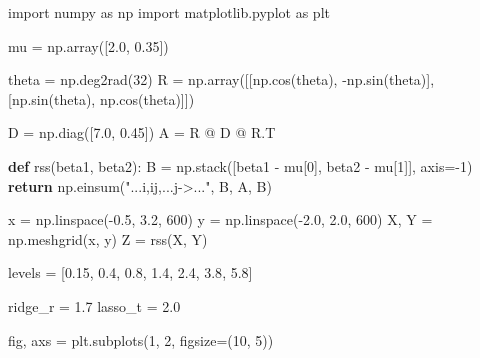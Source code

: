 \documentclass[
  letterpaper,
  DIV=11,
  numbers=noendperiod]{scrreprt}
\newenvironment{Shaded}{\begin{snugshade}}{\end{snugshade}}
\newcommand{\ControlFlowTok}[1]{\textcolor[rgb]{0.00,0.23,0.31}{\textbf{#1}}}
\newcommand{\DecValTok}[1]{\textcolor[rgb]{0.68,0.00,0.00}{#1}}
\newcommand{\FloatTok}[1]{\textcolor[rgb]{0.68,0.00,0.00}{#1}}
\newcommand{\ImportTok}[1]{\textcolor[rgb]{0.00,0.46,0.62}{#1}}
\newcommand{\KeywordTok}[1]{\textcolor[rgb]{0.00,0.23,0.31}{\textbf{#1}}}
\newcommand{\NormalTok}[1]{\textcolor[rgb]{0.00,0.23,0.31}{#1}}
\newcommand{\OperatorTok}[1]{\textcolor[rgb]{0.37,0.37,0.37}{#1}}
\newcommand{\StringTok}[1]{\textcolor[rgb]{0.13,0.47,0.30}{#1}}
\theoremstyle{definition}
\theoremstyle{definition}
\theoremstyle{plain}
\theoremstyle{plain}
\theoremstyle{remark}
\begin{document}
\begin{Shaded}
\begin{Highlighting}[]
\ImportTok{import}\NormalTok{ numpy }\ImportTok{as}\NormalTok{ np}
\ImportTok{import}\NormalTok{ matplotlib.pyplot }\ImportTok{as}\NormalTok{ plt}

\NormalTok{mu }\OperatorTok{=}\NormalTok{ np.array([}\FloatTok{2.0}\NormalTok{, }\FloatTok{0.35}\NormalTok{])}

\NormalTok{theta }\OperatorTok{=}\NormalTok{ np.deg2rad(}\DecValTok{32}\NormalTok{)}
\NormalTok{R }\OperatorTok{=}\NormalTok{ np.array([[np.cos(theta), }\OperatorTok{{-}}\NormalTok{np.sin(theta)], [np.sin(theta), np.cos(theta)]])}

\NormalTok{D }\OperatorTok{=}\NormalTok{ np.diag([}\FloatTok{7.0}\NormalTok{, }\FloatTok{0.45}\NormalTok{])}
\NormalTok{A }\OperatorTok{=}\NormalTok{ R }\OperatorTok{@}\NormalTok{ D }\OperatorTok{@}\NormalTok{ R.T}


\KeywordTok{def}\NormalTok{ rss(beta1, beta2):}
\NormalTok{    B }\OperatorTok{=}\NormalTok{ np.stack([beta1 }\OperatorTok{{-}}\NormalTok{ mu[}\DecValTok{0}\NormalTok{], beta2 }\OperatorTok{{-}}\NormalTok{ mu[}\DecValTok{1}\NormalTok{]], axis}\OperatorTok{={-}}\DecValTok{1}\NormalTok{)}
    \ControlFlowTok{return}\NormalTok{ np.einsum(}\StringTok{"...i,ij,...j{-}\textgreater{}..."}\NormalTok{, B, A, B)}


\NormalTok{x }\OperatorTok{=}\NormalTok{ np.linspace(}\OperatorTok{{-}}\FloatTok{0.5}\NormalTok{, }\FloatTok{3.2}\NormalTok{, }\DecValTok{600}\NormalTok{)}
\NormalTok{y }\OperatorTok{=}\NormalTok{ np.linspace(}\OperatorTok{{-}}\FloatTok{2.0}\NormalTok{, }\FloatTok{2.0}\NormalTok{, }\DecValTok{600}\NormalTok{)}
\NormalTok{X, Y }\OperatorTok{=}\NormalTok{ np.meshgrid(x, y)}
\NormalTok{Z }\OperatorTok{=}\NormalTok{ rss(X, Y)}

\NormalTok{levels }\OperatorTok{=}\NormalTok{ [}\FloatTok{0.15}\NormalTok{, }\FloatTok{0.4}\NormalTok{, }\FloatTok{0.8}\NormalTok{, }\FloatTok{1.4}\NormalTok{, }\FloatTok{2.4}\NormalTok{, }\FloatTok{3.8}\NormalTok{, }\FloatTok{5.8}\NormalTok{]}

\NormalTok{ridge\_r }\OperatorTok{=} \FloatTok{1.7}
\NormalTok{lasso\_t }\OperatorTok{=} \FloatTok{2.0}

\NormalTok{fig, axs }\OperatorTok{=}\NormalTok{ plt.subplots(}\DecValTok{1}\NormalTok{, }\DecValTok{2}\NormalTok{, figsize}\OperatorTok{=}\NormalTok{(}\DecValTok{10}\NormalTok{, }\DecValTok{5}\NormalTok{))}


\end{Highlighting}
\end{Shaded}
\end{document}
